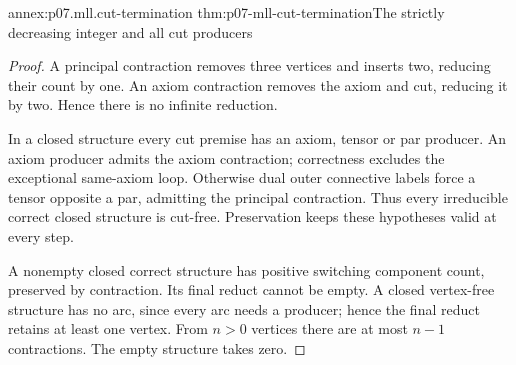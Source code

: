 \begin{annexitem}{annex:p07.mll.cut-termination}
 {thm:p07-mll-cut-termination}{The strictly decreasing integer and all cut producers}
\begin{proof}
A principal contraction removes three vertices and inserts two, reducing
their count by one. An axiom contraction removes the axiom and cut,
reducing it by two. Hence there is no infinite reduction.

In a closed structure every cut premise has an axiom, tensor or par
producer. An axiom producer admits the axiom contraction; correctness
excludes the exceptional same-axiom loop. Otherwise dual outer
connective labels force a tensor opposite a par, admitting the
principal contraction. Thus every irreducible correct closed structure
is cut-free. Preservation keeps these hypotheses valid at every step.

A nonempty closed correct structure has positive switching component
count, preserved by contraction. Its final reduct cannot be empty.
A closed vertex-free structure has no arc, since every arc needs a
producer; hence the final reduct retains at least one vertex.
From \(n>0\) vertices there are at most \(n-1\) contractions.
The empty structure takes zero.
\end{proof}
\end{annexitem}

